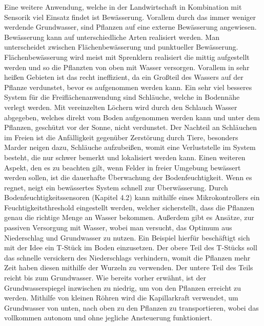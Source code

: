 Eine weitere Anwendung, welche in der Landwirtschaft in Kombination mit
Sensorik viel Einsatz findet ist Bewässerung. Vorallem durch das immer weniger
werdende Grundwasser, sind Pflanzen auf eine externe Bewässerung
angewiesen.\cite{liu2018self} Bewässerung kann auf unterschiedliche Arten
realisiert werden. Man unterscheidet zwischen Flächenbewässerung und
punktueller Bewässerung. Flächenbewässerung wird meist mit Sprenklern
realisiert die mittig aufgestellt werden und so die Pflanzten von oben mit
Wasser versorgen. Vorallem in sehr heißen Gebieten ist das recht ineffizient,
da ein Großteil des Wassers auf der Pflanze verdunstet, bevor es aufgenommen
werden kann. Ein sehr viel besseres System für die Freiflächenanwendung sind
Schläuche, welche in Bodennähe verlegt werden. Mit vereinzelten Löchern wird
durch den Schlauch Wasser abgegeben, welches direkt vom Boden aufgenommen
werden kann und unter dem Pflanzen, geschützt vor der Sonne, nicht verdunstet.
Der Nachteil an Schläuchen im Freien ist die Anfälligkeit gegenüber Zerstörung
durch Tiere, besonders Marder neigen dazu, Schläuche aufzubeißen, womit eine
Verluststelle im System besteht, die nur schwer bemerkt und lokalisiert werden
kann. Einen weiteren Aspekt, den es zu beachten gilt, wenn Felder in freier
Umgebung bewässert werden sollen, ist die dauerhafte Überwachung der
Bodenfeuchtigkeit. Wenn es regnet, neigt ein bewässertes System schnell zur
Überwässerung. Durch Bodenfeuchtigkeitssensoren (Kapitel 4.2) kann mithilfe
eines Mikrokontrollers ein Feuchtigkeitsthreshold eingestellt werden, welcher
sicherstellt, dass die Pflanzen genau die richtige Menge an Wasser bekommen.
Außerdem gibt es Ansätze, zur passiven Versorgung mit Wasser, wobei man
versucht, das Optimum aus Niederschlag und Grundwasser zu nutzen. Ein Beispiel
hierfür beschäftigt sich mit der Idee ein T-Stück im Boden einzusetzen. Der
obere Teil des T-Stücks soll das schnelle versickern des Niederschlags
verhindern, womit die Pflanzen mehr Zeit haben diesen mithilfe der Wurzeln zu
verwenden. Der untere Teil des Teils reicht bis zum Grundwasser. Wie bereits
vorher erwähnt, ist der Grundwasserspiegel inzwischen zu niedrig, um von den
Pflanzen erreicht zu werden. Mithilfe von kleinen Röhren wird die Kapillarkraft
verwendet, um Grundwasser von unten, nach oben zu den Pflanzen zu
transportieren, wobei das vollkommen autonom und ohne jegliche Ansteuerung
funktioniert.\cite{liu2018self}

